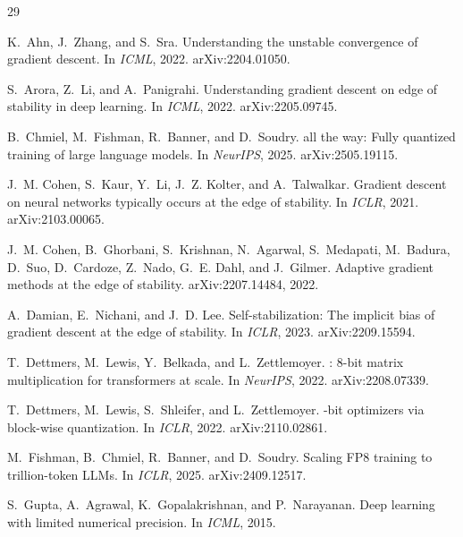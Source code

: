 \documentclass[11pt,letterpaper]{article}
\begin{document}
\clearpage
{\footnotesize
\begin{thebibliography}{29}
\setlength{\itemsep}{0pt}

K.~Ahn, J.~Zhang, and S.~Sra.
\newblock Understanding the unstable convergence of gradient descent.
\newblock In \emph{ICML}, 2022. arXiv:2204.01050.

S.~Arora, Z.~Li, and A.~Panigrahi.
\newblock Understanding gradient descent on edge of stability in deep learning.
\newblock In \emph{ICML}, 2022. arXiv:2205.09745.

B.~Chmiel, M.~Fishman, R.~Banner, and D.~Soudry.
 all the way: Fully quantized training of large language models.
\newblock In \emph{NeurIPS}, 2025. arXiv:2505.19115.

J.~M. Cohen, S.~Kaur, Y.~Li, J.~Z. Kolter, and A.~Talwalkar.
\newblock Gradient descent on neural networks typically occurs at the edge of stability.
\newblock In \emph{ICLR}, 2021. arXiv:2103.00065.

J.~M. Cohen, B.~Ghorbani, S.~Krishnan, N.~Agarwal, S.~Medapati, M.~Badura, D.~Suo, D.~Cardoze, Z.~Nado, G.~E. Dahl, and J.~Gilmer.
\newblock Adaptive gradient methods at the edge of stability.
\newblock arXiv:2207.14484, 2022.

A.~Damian, E.~Nichani, and J.~D. Lee.
\newblock Self-stabilization: The implicit bias of gradient descent at the edge of stability.
\newblock In \emph{ICLR}, 2023. arXiv:2209.15594.

T.~Dettmers, M.~Lewis, Y.~Belkada, and L.~Zettlemoyer.
: 8-bit matrix multiplication for transformers at scale.
\newblock In \emph{NeurIPS}, 2022. arXiv:2208.07339.

T.~Dettmers, M.~Lewis, S.~Shleifer, and L.~Zettlemoyer.
-bit optimizers via block-wise quantization.
\newblock In \emph{ICLR}, 2022. arXiv:2110.02861.

M.~Fishman, B.~Chmiel, R.~Banner, and D.~Soudry.
\newblock Scaling {FP8} training to trillion-token {LLMs}.
\newblock In \emph{ICLR}, 2025. arXiv:2409.12517.

S.~Gupta, A.~Agrawal, K.~Gopalakrishnan, and P.~Narayanan.
\newblock Deep learning with limited numerical precision.
\newblock In \emph{ICML}, 2015.


\end{thebibliography}}
\end{document}
